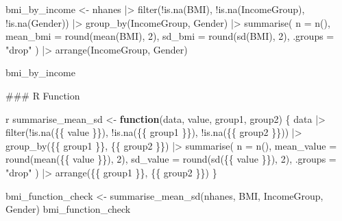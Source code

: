 \documentclass[
  letterpaper,
  DIV=11,
  numbers=noendperiod,
  oneside]{scrreprt}
\newenvironment{Shaded}{\begin{snugshade}}{\end{snugshade}}
\newcommand{\AttributeTok}[1]{\textcolor[rgb]{0.40,0.45,0.13}{#1}}
\newcommand{\ControlFlowTok}[1]{\textcolor[rgb]{0.00,0.23,0.31}{\textbf{#1}}}
\newcommand{\DecValTok}[1]{\textcolor[rgb]{0.68,0.00,0.00}{#1}}
\newcommand{\FunctionTok}[1]{\textcolor[rgb]{0.28,0.35,0.67}{#1}}
\newcommand{\InformationTok}[1]{\textcolor[rgb]{0.37,0.37,0.37}{#1}}
\newcommand{\NormalTok}[1]{\textcolor[rgb]{0.00,0.23,0.31}{#1}}
\newcommand{\OtherTok}[1]{\textcolor[rgb]{0.00,0.23,0.31}{#1}}
\newcommand{\SpecialCharTok}[1]{\textcolor[rgb]{0.37,0.37,0.37}{#1}}
\newcommand{\StringTok}[1]{\textcolor[rgb]{0.13,0.47,0.30}{#1}}
\begin{document}
\begin{Shaded}
\begin{Highlighting}[numbers=left,,]
\NormalTok{bmi\_by\_income }\OtherTok{\textless{}{-}}\NormalTok{ nhanes }\SpecialCharTok{|\textgreater{}}
  \FunctionTok{filter}\NormalTok{(}\SpecialCharTok{!}\FunctionTok{is.na}\NormalTok{(BMI), }\SpecialCharTok{!}\FunctionTok{is.na}\NormalTok{(IncomeGroup), }\SpecialCharTok{!}\FunctionTok{is.na}\NormalTok{(Gender)) }\SpecialCharTok{|\textgreater{}}
  \FunctionTok{group\_by}\NormalTok{(IncomeGroup, Gender) }\SpecialCharTok{|\textgreater{}}
  \FunctionTok{summarise}\NormalTok{(}
    \AttributeTok{n =} \FunctionTok{n}\NormalTok{(),}
    \AttributeTok{mean\_bmi =} \FunctionTok{round}\NormalTok{(}\FunctionTok{mean}\NormalTok{(BMI), }\DecValTok{2}\NormalTok{),}
    \AttributeTok{sd\_bmi =} \FunctionTok{round}\NormalTok{(}\FunctionTok{sd}\NormalTok{(BMI), }\DecValTok{2}\NormalTok{),}
    \AttributeTok{.groups =} \StringTok{"drop"}
\NormalTok{  ) }\SpecialCharTok{|\textgreater{}}
  \FunctionTok{arrange}\NormalTok{(IncomeGroup, Gender)}

\NormalTok{bmi\_by\_income}
\InformationTok{\textasciigrave{}\textasciigrave{}\textasciigrave{}}

\FunctionTok{\#\#\# R Function}

\InformationTok{\textasciigrave{}\textasciigrave{}\textasciigrave{}r}
\NormalTok{summarise\_mean\_sd }\OtherTok{\textless{}{-}} \ControlFlowTok{function}\NormalTok{(data, value, group1, group2) \{}
\NormalTok{  data }\SpecialCharTok{|\textgreater{}}
    \FunctionTok{filter}\NormalTok{(}\SpecialCharTok{!}\FunctionTok{is.na}\NormalTok{(\{\{ value \}\}), }\SpecialCharTok{!}\FunctionTok{is.na}\NormalTok{(\{\{ group1 \}\}), }\SpecialCharTok{!}\FunctionTok{is.na}\NormalTok{(\{\{ group2 \}\})) }\SpecialCharTok{|\textgreater{}}
    \FunctionTok{group\_by}\NormalTok{(\{\{ group1 \}\}, \{\{ group2 \}\}) }\SpecialCharTok{|\textgreater{}}
    \FunctionTok{summarise}\NormalTok{(}
      \AttributeTok{n =} \FunctionTok{n}\NormalTok{(),}
      \AttributeTok{mean\_value =} \FunctionTok{round}\NormalTok{(}\FunctionTok{mean}\NormalTok{(\{\{ value \}\}), }\DecValTok{2}\NormalTok{),}
      \AttributeTok{sd\_value =} \FunctionTok{round}\NormalTok{(}\FunctionTok{sd}\NormalTok{(\{\{ value \}\}), }\DecValTok{2}\NormalTok{),}
      \AttributeTok{.groups =} \StringTok{"drop"}
\NormalTok{    ) }\SpecialCharTok{|\textgreater{}}
    \FunctionTok{arrange}\NormalTok{(\{\{ group1 \}\}, \{\{ group2 \}\})}
\NormalTok{\}}

\NormalTok{bmi\_function\_check }\OtherTok{\textless{}{-}} \FunctionTok{summarise\_mean\_sd}\NormalTok{(nhanes, BMI, IncomeGroup, Gender)}
\NormalTok{bmi\_function\_check}
\InformationTok{\textasciigrave{}\textasciigrave{}\textasciigrave{}}


\end{Highlighting}
\end{Shaded}
\end{document}
